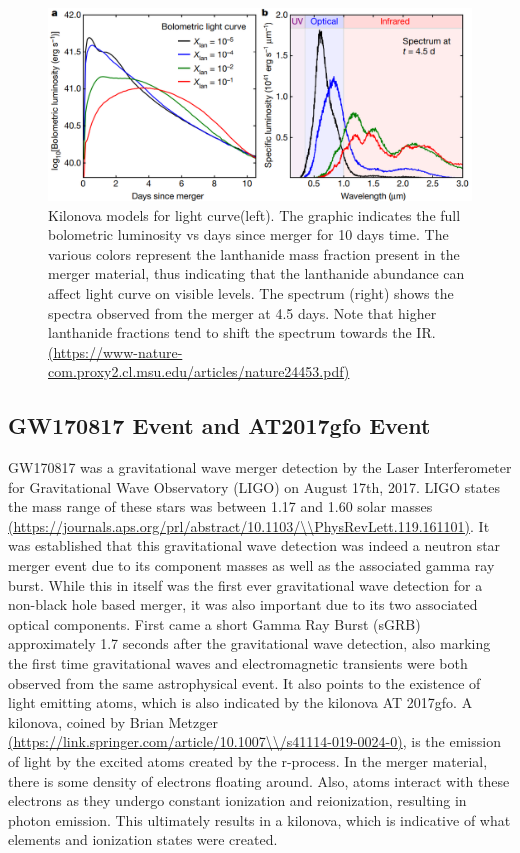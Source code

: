 \documentclass[11pt,a4paper]{article}
\begin{document}
\begin{figure}[h!]
  \includegraphics[width=1\textwidth]{kasen_curves.png}
  \caption{ Kilonova models for light curve(left). The graphic indicates the full bolometric luminosity vs days since merger for 10 days time. The various colors represent the lanthanide mass fraction present in the merger material, thus indicating that the lanthanide abundance can affect light curve on visible levels. The spectrum (right) shows the spectra observed from the merger at 4.5 days. Note that higher lanthanide fractions tend to shift the spectrum towards the IR. \url{(https://www-nature-com.proxy2.cl.msu.edu/articles/nature24453.pdf)} }
\end{figure}

\pagebreak

\subsection{GW170817 Event and AT2017gfo Event}

GW170817 was a gravitational wave merger detection by the Laser Interferometer for Gravitational Wave Observatory (LIGO) on August 17th, 2017. LIGO states the mass range of these stars was between 1.17 and 1.60 solar masses \url{(https://journals.aps.org/prl/abstract/10.1103/\\PhysRevLett.119.161101)}. It was established that this gravitational wave detection was indeed a neutron star merger event due to its component masses as well as the associated gamma ray burst. While this in itself was the first ever gravitational wave detection for a non-black hole based merger, it was also important due to its two associated optical components. 
First came a short Gamma Ray Burst (sGRB) approximately 1.7 seconds after the gravitational wave detection, also marking the first time gravitational waves and electromagnetic transients were both observed from the same astrophysical event. It also points to the existence of light emitting atoms, which is also indicated by the kilonova AT 2017gfo. A kilonova, coined by Brian Metzger \url{(https://link.springer.com/article/10.1007\\/s41114-019-0024-0)}, is the emission of light by the excited atoms created by the r-process. In the merger material, there is some density of electrons floating around. Also, atoms interact with these electrons as they undergo constant ionization and reionization, resulting in photon emission. This ultimately results in a kilonova, which is indicative of what elements and ionization states were created. 
\end{document}
